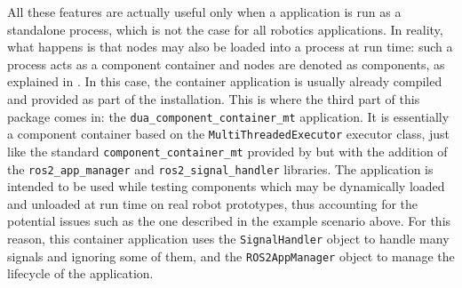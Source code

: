 All these features are actually useful only when a \ROS application is run as a standalone process, which is not the case for all robotics applications. In reality, what happens is that nodes may also be loaded into a process at run time: such a process acts as a component container and nodes are denoted as components, as explained in . In this case, the container application is usually already compiled and provided as part of the \ROS installation. This is where the third part of this package comes in: the \texttt{dua\_component\_container\_mt} application. It is essentially a component container based on the \texttt{MultiThreadedExecutor} executor class, just like the standard \texttt{component\_container\_mt} provided by \ROS but with the addition of the \texttt{ros2\_app\_manager} and \texttt{ros2\_signal\_handler} libraries. The application is intended to be used while testing \ROS components which may be dynamically loaded and unloaded at run time on real robot prototypes, thus accounting for the potential issues such as the one described in the example scenario above. For this reason, this container application uses the \texttt{SignalHandler} object to handle many signals and ignoring some of them, and the \texttt{ROS2AppManager} object to manage the lifecycle of the application.

